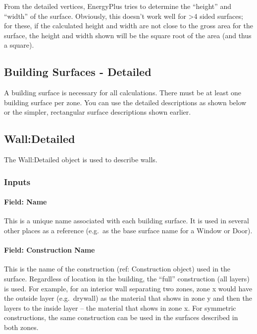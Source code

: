 From the detailed vertices, EnergyPlus tries to determine the ``height'' and ``width'' of the surface. Obviously, this doesn't work well for \textgreater{}4 sided surfaces; for these, if the calculated height and width are not close to the gross area for the surface, the height and width shown will be the square root of the area (and thus a square).

\subsection{Building Surfaces - Detailed}\label{building-surfaces---detailed}

A building surface is necessary for all calculations. There must be at least one building surface per zone. You can use the detailed descriptions as shown below or the simpler, rectangular surface descriptions shown earlier.

\subsection{Wall:Detailed}\label{walldetailed}

The Wall:Detailed object is used to describe walls.

\subsubsection{Inputs}\label{inputs-20-007}

\paragraph{Field: Name}\label{field-name-16-010}

This is a unique name associated with each building surface. It is used in several other places as a reference (e.g.~as the base surface name for a Window or Door).

\paragraph{Field: Construction Name}\label{field-construction-name-16}

This is the name of the construction (ref: Construction object) used in the surface. Regardless of location in the building, the ``full'' construction (all layers) is used. For example, for an interior wall separating two zones, zone x would have the outside layer (e.g.~drywall) as the material that shows in zone y and then the layers to the inside layer -- the material that shows in zone x. For symmetric constructions, the same construction can be used in the surfaces described in both zones.

